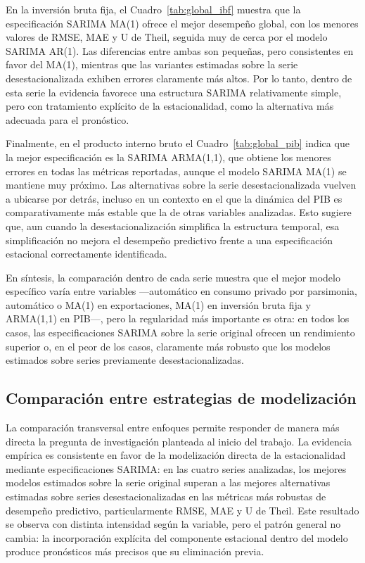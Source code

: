 \documentclass[11pt]{article}
\begin{document}
En la inversión bruta fija, el Cuadro~\ref{tab:global_ibf} muestra que la especificación SARIMA MA(1) ofrece el mejor desempeño global, con los menores valores de RMSE, MAE y U de Theil, seguida muy de cerca por el modelo SARIMA AR(1). Las diferencias entre ambas son pequeñas, pero consistentes en favor del MA(1), mientras que las variantes estimadas sobre la serie desestacionalizada exhiben errores claramente más altos. Por lo tanto, dentro de esta serie la evidencia favorece una estructura SARIMA relativamente simple, pero con tratamiento explícito de la estacionalidad, como la alternativa más adecuada para el pronóstico.

Finalmente, en el producto interno bruto el Cuadro~\ref{tab:global_pib} indica que la mejor especificación es la SARIMA ARMA(1,1), que obtiene los menores errores en todas las métricas reportadas, aunque el modelo SARIMA MA(1) se mantiene muy próximo. Las alternativas sobre la serie desestacionalizada vuelven a ubicarse por detrás, incluso en un contexto en el que la dinámica del PIB es comparativamente más estable que la de otras variables analizadas. Esto sugiere que, aun cuando la desestacionalización simplifica la estructura temporal, esa simplificación no mejora el desempeño predictivo frente a una especificación estacional correctamente identificada.

En síntesis, la comparación dentro de cada serie muestra que el mejor modelo específico varía entre variables ---automático en consumo privado por parsimonia, automático o MA(1) en exportaciones, MA(1) en inversión bruta fija y ARMA(1,1) en PIB---, pero la regularidad más importante es otra: en todos los casos, las especificaciones SARIMA sobre la serie original ofrecen un rendimiento superior o, en el peor de los casos, claramente más robusto que los modelos estimados sobre series previamente desestacionalizadas.

\subsection{Comparación entre estrategias de modelización}

La comparación transversal entre enfoques permite responder de manera más directa la pregunta de investigación planteada al inicio del trabajo. La evidencia empírica es consistente en favor de la modelización directa de la estacionalidad mediante especificaciones SARIMA: en las cuatro series analizadas, los mejores modelos estimados sobre la serie original superan a las mejores alternativas estimadas sobre series desestacionalizadas en las métricas más robustas de desempeño predictivo, particularmente RMSE, MAE y U de Theil. Este resultado se observa con distinta intensidad según la variable, pero el patrón general no cambia: la incorporación explícita del componente estacional dentro del modelo produce pronósticos más precisos que su eliminación previa.
\end{document}
